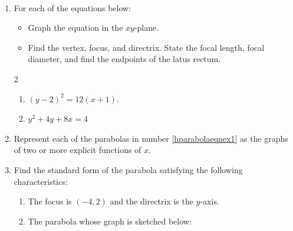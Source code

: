 \documentclass{ximera}
\begin{document}
\begin{example} \label{horizontalparabolaex}  $~$

\begin{enumerate} 

\item \label{hparabolaeqnex1} For each of the equations below:

\begin{itemize}

\item  Graph the equation in the $xy$-plane.

\item  Find the vertex, focus, and directrix.  State the focal length, focal diameter, and find the endpoints of the latus rectum.

\end{itemize}

\begin{multicols}{2}

\begin{enumerate}

\item $(y-2)^2 = 12(x+1)$. 

\item \label{ctsparabolaex} $y^2 + 4y + 8x = 4$

\end{enumerate}

\end{multicols}

\item  Represent each of the parabolas in number \ref{hparabolaeqnex1} as the graphs of two or more explicit functions of $x$.

\item  Find the standard form of the parabola satisfying the following characteristics:

\begin{enumerate}

\item  The focus is $(-4,2)$ and the directrix is the $y$-axis.

\item  The parabola whose graph is sketched below:


\end{enumerate}
\end{enumerate}
\end{example}
\end{document}

